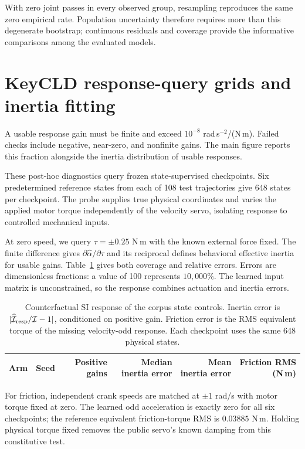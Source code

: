\documentclass[10pt,twocolumn,letterpaper]{article}
\begin{document}
With zero joint passes in every observed group, resampling reproduces the same zero empirical rate. Population uncertainty therefore requires more than this degenerate bootstrap; continuous residuals and coverage provide the informative comparisons among the evaluated models.

\section{KeyCLD response-query grids and inertia fitting}
\label{app:corpus-probes}
A usable response gain must be finite and exceed $10^{-8}$ rad\,s$^{-2}$/(N\,m). Failed checks include negative, near-zero, and nonfinite gains. The main figure reports this fraction alongside the inertia distribution of usable responses.

These post-hoc diagnostics query frozen state-supervised checkpoints. Six predetermined reference states from each of 108 test trajectories give 648 states per checkpoint. The probe supplies true physical coordinates and varies the applied motor torque independently of the velocity servo, isolating response to controlled mechanical inputs.

At zero speed, we query $\tau=\pm0.25$ N\,m with the known external force fixed. The finite difference gives $\partial\widehat\alpha/\partial\tau$ and its reciprocal defines behavioral effective inertia for usable gains. Table~\ref{app:corpus-response} gives both coverage and relative errors. Errors are dimensionless fractions: a value of 100 represents $10{,}000\%$. The learned input matrix is unconstrained, so the response combines actuation and inertia errors.

\begin{table}[t]
\caption{Counterfactual SI response of the corpus state controls. Inertia error is $|\widehat{\mathcal I}_{\rm resp}/\mathcal I-1|$, conditioned on positive gain. Friction error is the RMS equivalent torque of the missing velocity-odd response. Each checkpoint uses the same 648 physical states.}
\label{app:corpus-response}
\centering\small
\begin{tabular}{lrrrrr}
\toprule
Arm & Seed & Positive gains & Median inertia error & Mean inertia error & Friction RMS (N\,m)\\
\midrule

\bottomrule
\end{tabular}
\end{table}

For friction, independent crank speeds are matched at $\pm1$ rad/s with motor torque fixed at zero. The learned odd acceleration is exactly zero for all six checkpoints; the reference equivalent friction-torque RMS is $0.03885$ N\,m. Holding physical torque fixed removes the public servo's known damping from this constitutive test.
\end{document}
